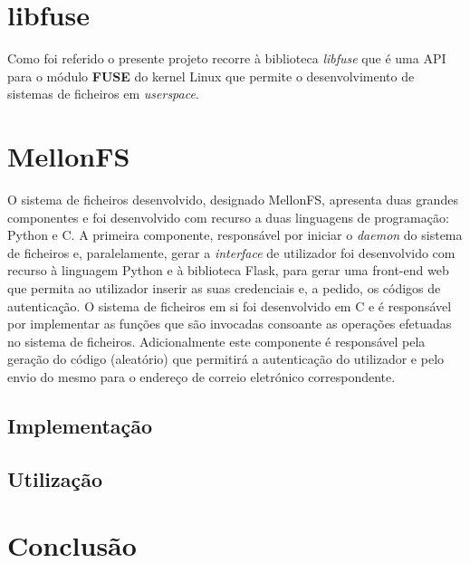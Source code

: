 \documentclass{article}
\begin{document}
\section{libfuse}
Como foi referido o presente projeto recorre à biblioteca \textit{libfuse} que é uma API para o módulo \textbf{FUSE} do kernel Linux que permite o desenvolvimento de sistemas de ficheiros em \textit{userspace}.

\section{MellonFS}
O sistema de ficheiros desenvolvido, designado MellonFS, apresenta duas grandes componentes e foi desenvolvido com recurso a duas linguagens de programação: Python e C.
A primeira componente, responsável por iniciar o \textit{daemon} do sistema de ficheiros e, paralelamente, gerar a \textit{interface} de utilizador foi desenvolvido com recurso à linguagem Python e à biblioteca Flask, para gerar uma front-end web que permita ao utilizador inserir as suas credenciais e, a pedido, os códigos de autenticação.
O sistema de ficheiros em si foi desenvolvido em C e é responsável por implementar as funções que são invocadas consoante as operações efetuadas no sistema de ficheiros. Adicionalmente este componente é responsável pela geração do código (aleatório) que permitirá a autenticação do utilizador e pelo envio do mesmo para o endereço de correio eletrónico correspondente.
\subsection{Implementação}

\subsection{Utilização}

\section{Conclusão}
\end{document}
